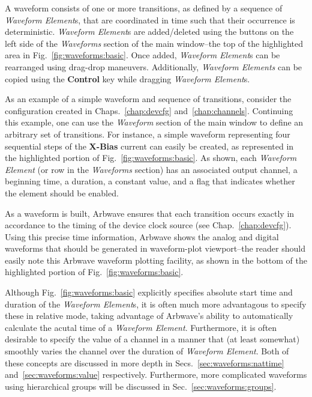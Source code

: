 A waveform consists of one or more transitions, as defined by a sequence of
\textit{Waveform Element}s, that are coordinated in time such that their
occurrence is deterministic.  \textit{Waveform Element}s are added/deleted using
the buttons on the left side of the \textit{Waveforms} section of the main
window--the top of the highlighted area in Fig.~\ref{fig:waveforms:basic}.  Once
added, \textit{Waveform Element}s can be rearranged using drag-drop maneuvers.
Additionally, \textit{Waveform Elements} can be copied using the
\textbf{Control} key while dragging \textit{Waveform Element}s.

As an example of a simple waveform and sequence of transitions, consider the
configuration created
in Chaps.~\ref{chap:devcfg} and~\ref{chap:channels}.  Continuing this example,
one can use the \textit{Waveform} section of the main window to define an
arbitrary set of transitions.  For instance, a simple waveform representing four
sequential steps of the \textbf{X-Bias} current can easily be created, as
represented in the highlighted portion of Fig.~\ref{fig:waveforms:basic}.  As
shown, each \textit{Waveform Element} (or row in the \textit{Waveforms} section)
has an associated output channel, a beginning time, a duration, a constant
value, and a flag that indicates whether the element should be enabled.

As a waveform is built, Arbwave ensures that each transition occurs exactly in
accordance to the timing of the device clock source (see
Chap.~\ref{chap:devcfg}).  Using this precise time information, Arbwave shows
the analog and digital waveforms that should be generated in waveform-plot
viewport--the reader should easily note this Arbwave waveform plotting facility,
as shown in the bottom of the highlighted portion of
Fig.~\ref{fig:waveforms:basic}.

Although Fig.~\ref{fig:waveforms:basic} explicitly specifies absolute start time
and duration of the \textit{Waveform Element}s, it is often much more
advantagous to specify these in relative mode, taking advantage of Arbwave's
ability to automatically calculate the acutal time of a \textit{Waveform
Element}.  Furthermore, it is often desirable to specify the value of a channel
in a manner that (at least somewhat) smoothly varies the channel over the
duration of \textit{Waveform Element}.  Both of these concepts are discussed in
more depth in Secs.~\ref{sec:waveforms:nattime} and~\ref{sec:waveforms:value}
respectively.  Furthermore, more complicated waveforms using hierarchical groups
will be discussed in Sec.~\ref{sec:waveforms:groups}.



